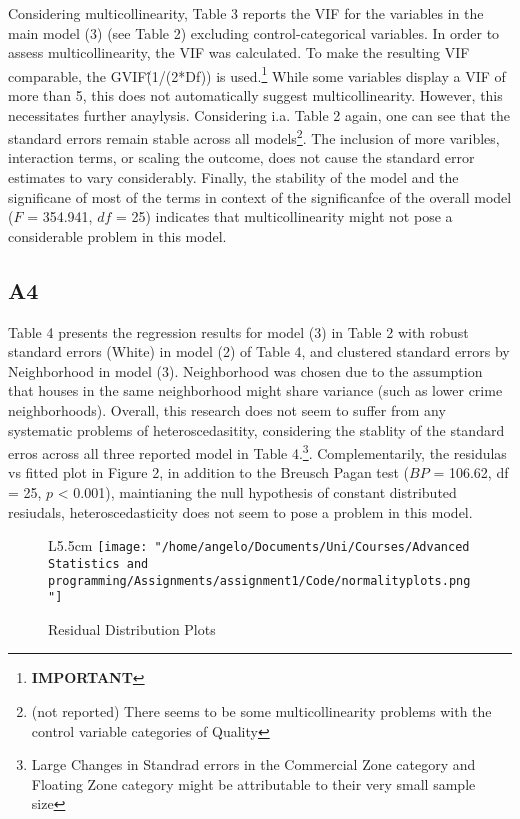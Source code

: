 \documentclass[a4paper]{article}
\begin{document}
Considering multicollinearity, Table 3 reports the VIF for the variables in the main model (3) (see Table 2) excluding control-categorical variables. In order to assess multicollinearity, the VIF was calculated. To make the resulting VIF comparable, the GVIF\^(1/(2*Df)) is used.\footnote{\textbf{IMPORTANT %
}} While some variables display a VIF of more than 5, this does not automatically suggest multicollinearity. However, this necessitates further anaylysis. Considering i.a. Table 2 again, one can see that the standard errors remain stable across all models\footnote{(not reported) There seems to be some multicollinearity problems with the control variable categories of Quality}. The inclusion of more varibles, interaction terms, or scaling the outcome, does not cause the standard error estimates to vary considerably. Finally, the stability of the model and the significane of most of the terms in context of the significanfce of the overall model ($F$ = 354.941, $df$ = 25) indicates that multicollinearity might not pose a considerable problem in this model.

\subsection{A4}
Table 4 presents the regression results for model (3) in Table 2 with robust standard errors (White) in model (2) of Table 4, and clustered standard errors by Neighborhood in model (3). Neighborhood was chosen due to the assumption that houses in the same neighborhood might share variance (such as lower crime neighborhoods). Overall, this research does not seem to suffer from any systematic problems of heteroscedasitity, considering the stablity of the standard erros across all three reported model in Table 4.\footnote{Large Changes in Standrad errors in the Commercial Zone category and Floating Zone category might be attributable to their very small sample size}. Complementarily, the residulas vs fitted plot in Figure 2, in addition to the Breusch Pagan test ($BP$ = 106.62, df = 25, $p$ < 0.001), maintianing the null hypothesis of constant distributed resiudals, heteroscedasticity does not seem to pose a problem in this model. 



\begin{figure}{L}{5.5cm}
		\centering
         \texttt{[image: "/home/angelo/Documents/Uni/Courses/Advanced Statistics and programming/Assignments/assignment1/Code/normalityplots.png"]}
         \small
         \caption{Residual Distribution Plots}


\end{figure}
\end{document}

